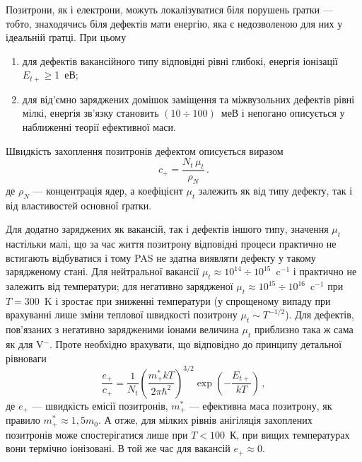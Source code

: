 \documentclass[10pt,a5paper,titlepage,oneside]{book}
\numberwithin{equation}{part}
\begin{document}
Позитрони, як і електрони, можуть локалізуватися біля порушень ґратки --- тобто, знаходячись біля дефектів мати енергію,
яка є недозволеною для них у ідеальній ґратці.
При цьому
\begin{enumerate}[label=\asbuk*),leftmargin=0em,itemindent=1.5em]
\item для дефектів вакансійного типу відповідні рівні глибокі, енергія іонізації $E_{t+}\geq$1~еВ;
\item для від'ємно заряджених домішок заміщення та міжвузольних дефектів рівні мілкі,
 енергія зв'язку становить $(10\div100)$~меВ і
непогано описується у наближенні теорії ефективної маси.
\end{enumerate}

Швидкість захоплення позитронів дефектом описується виразом
\begin{equation}\label{PASc}
c_+=\frac{N_t\,\mu_t}{\rho_N}\,.
\end{equation}
де
$\rho_N$ --- концентрація ядер,
а коефіцієнт $\mu_t$ залежить як від типу дефекту, так і від властивостей основної ґратки.

Для додатно заряджених як вакансій, так і дефектів іншого типу, значення $\mu_t$
настільки малі, що за час життя позитрону відповідні процеси практично не встигають відбуватися і тому
PAS не здатна виявляти дефекту у такому зарядженому стані.
Для нейтральної вакансії $\mu_t\approx10^{14}\div10^{15}$~c$^{-1}$ і практично не залежить від температури;
для негативно зарядженої $\mu_t\approx10^{15}\div10^{16}$~c$^{-1}$ при $T=300$~K і зростає при
зниженні температури (у спрощеному випаду при врахуванні лише зміни теплової швидкості
позитрону $\mu_t\sim T^{-1/2}$).
Для дефектів, пов'язаних з негативно зарядженими іонами величина $\mu_t$ приблизно така ж сама
як для V$^-$.
Проте необхідно врахувати, що відповідно до принципу детальної рівноваги
\begin{equation}\label{PASce}
\frac{e_+}{c_+}=\frac{1}{N_t}\left(\frac{m_+^*kT}{2\pi\hbar^2}\right)^{3/2}\exp\left(-\frac{E_{t+}}{kT}\right)\,,
\end{equation}
де
$e_+$ --- швидкість емісії позитронів,
$m_+^*$ --- ефективна маса позитрону, як правило $m_+^*\approx1,5 m_0$.
А отже, для мілких рівнів анігіляція захоплених позитронів може спостерігатися лише при
$T<100$~К, при вищих температурах вони термічно іонізовані.
В той же час для вакансій $e_+\approx0$.
\end{document}
